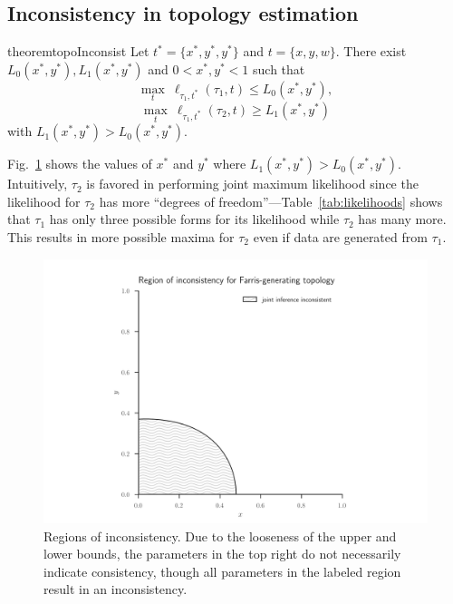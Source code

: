 \documentclass{article}
\begin{document}
\subsection*{Inconsistency in topology estimation}

\begin{restatable}{theorem}{topoInconsist}
Let $t^*=\{x^*, y^*, y^*\}$ and $t=\{x, y, w\}$.
There exist $L_0(x^*, y^*), L_1(x^*, y^*)$ and $0 < x^*, y^* < 1$ such that
$$
\max_{t} \ \ell_{\tau_1,t^*}(\tau_1, t) \le L_0(x^*, y^*),
$$
$$
\max_{t} \ \ell_{\tau_1,t^*}(\tau_2, t) \ge L_1(x^*, y^*)
$$
with $L_1(x^*, y^*) > L_0(x^*, y^*)$.
\end{restatable}
Fig.~\ref{fig:inconsistency-farris} shows the values of $x^*$ and $y^*$ where $L_1(x^*, y^*) > L_0(x^*, y^*)$.
Intuitively, $\tau_2$ is favored in performing joint maximum likelihood since the likelihood for $\tau_2$ has more ``degrees of freedom''---Table~\ref{tab:likelihoods} shows that $\tau_1$ has only three possible forms for its likelihood while $\tau_2$ has many more.
This results in more possible maxima for $\tau_2$ even if data are generated from $\tau_1$.

\begin{figure}
\centering
\includegraphics[width=.9\textwidth]{topology-inconsistency-inkscape}
\caption{
    Regions of inconsistency.
    Due to the looseness of the upper and lower bounds, the parameters in the top right do not necessarily indicate consistency, though all parameters in the labeled region result in an inconsistency.
}
\label{fig:inconsistency-farris}
\end{figure}
\end{document}

